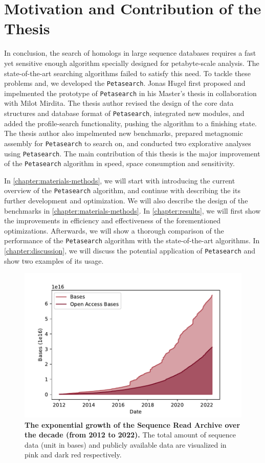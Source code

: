 \section{Motivation and Contribution of the Thesis}

In conclusion, the search of homologs in large sequence databases requires a fast yet sensitive enough algorithm specially designed for petabyte-scale analysis.
The state-of-the-art searching algorithms failed to satisfy this need.
To tackle these problems and, we developed the \texttt{Petasearch}.
Jonas H{$\ddot{u}$}gel first proposed and impelmented the prototype of \texttt{Petasearch} in his Master's thesis in collaboration with Milot Mirdita.
The thesis author revised the design of the core data structures and database format of \texttt{Petasearch}, integrated new modules, and added the profile-search functionality, pushing the algorithm to a finishing state.
The thesis author also impelmented new benchmarks, prepared metagnomic assembly for \texttt{Petasearch} to search on, and conducted two explorative analyses using \texttt{Petasearch}.
The main contribution of this thesis is the major improvement of the \texttt{Petasearch} algorithm in speed, space consumption and sensitivity.

In \cref{chapter:materials-methods}, we will start with introducing the current overview of the \texttt{Petasearch} algorithm, and continue with describing the its further development and optimization.
We will also describe the design of the benchmarks in \cref{chapter:materials-methods}.
In \cref{chapter:results}, we will first show the improvements in efficiency and effectiveness of the forementioned optimizations.
Afterwards, we will show a thorough comparison of the performance of the \texttt{Petasearch} algorithm with the state-of-the-art algorithms.
In \cref{chapter:discussion}, we will discuss the potential application of \texttt{Petasearch} and show two examples of its usage.


\begin{figure}[htbp]
  \centering
  \includegraphics[width=\textwidth]{images/sra_stat.pdf}
  \caption{\textbf{The exponential growth of the Sequence Read Archive over the decade (from 2012 to 2022).}
The total amount of sequence data (unit in bases) and publicly available data are visualized in pink and dark red respectively.}
  \label{fig:sra_stat}
\end{figure}
\pagebreak
